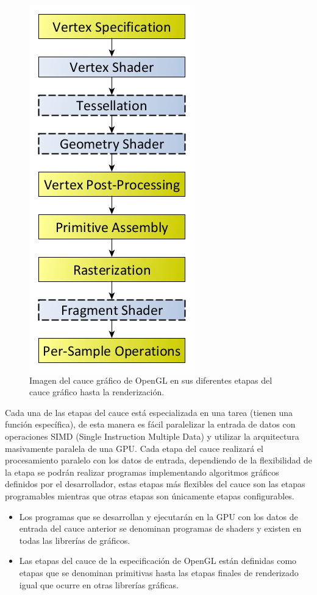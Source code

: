 \documentclass[a4paper, 17pt]{book}
\begin{document}
\begin{figure}[H]
    \centering
    \includegraphics[scale=0.40, keepaspectratio]{img/RenderingPipeline.png}
    \caption{Imagen del cauce gráfico de OpenGL en sus diferentes etapas del cauce gráfico hasta la renderización.}
    \label{figura:khronos}
\end{figure}

Cada una de las etapas del cauce está especializada en una tarea (tienen una función específica), de esta manera es fácil
paralelizar la entrada de datos con operaciones SIMD (Single Instruction Multiple Data) y utilizar la arquitectura masivamente
paralela de una GPU. Cada etapa del cauce realizará el procesamiento paralelo con los datos de entrada, dependiendo de la
flexibilidad de la etapa se podrán realizar programas implementando algoritmos gráficos definidos por el desarrollador,
estas etapas más flexibles del cauce son las etapas programables mientras que otras etapas son únicamente etapas configurables.


\begin{itemize}
  \item Los programas que se desarrollan y ejecutarán en la GPU con los datos de entrada del cauce anterior se denominan programas
  de shaders y existen en todas las librerías de gráficos.
  
  \item Las etapas del cauce de la especificación de OpenGL están definidas como etapas que se denominan primitivas hasta las etapas
  finales de renderizado igual que ocurre en otras librerías gráficas.
\end{itemize}
\end{document}
